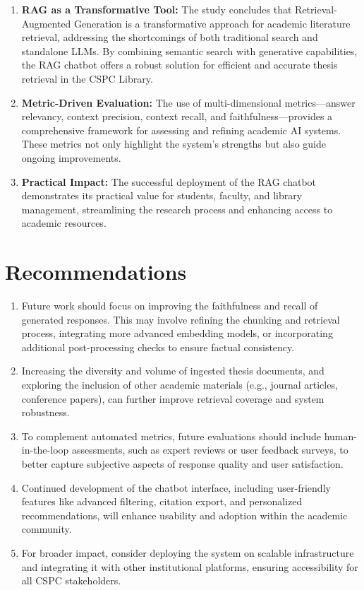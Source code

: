 \begin{refsection}
\begin{enumerate}
    \item \textbf{RAG as a Transformative Tool:} The study concludes that Retrieval-Augmented Generation is a transformative approach for academic literature retrieval, addressing the shortcomings of both traditional search and standalone LLMs. By combining semantic search with generative capabilities, the RAG chatbot offers a robust solution for efficient and accurate thesis retrieval in the CSPC Library.
    \item \textbf{Metric-Driven Evaluation:} The use of multi-dimensional metrics---answer relevancy, context precision, context recall, and faithfulness---provides a comprehensive framework for assessing and refining academic AI systems. These metrics not only highlight the system’s strengths but also guide ongoing improvements.
    \item \textbf{Practical Impact:} The successful deployment of the RAG chatbot demonstrates its practical value for students, faculty, and library management, streamlining the research process and enhancing access to academic resources.
\end{enumerate}

\section*{Recommendations}

\begin{enumerate}
    \item Future work should focus on improving the faithfulness and recall of generated responses. This may involve refining the chunking and retrieval process, integrating more advanced embedding models, or incorporating additional post-processing checks to ensure factual consistency.
    \item Increasing the diversity and volume of ingested thesis documents, and exploring the inclusion of other academic materials (e.g., journal articles, conference papers), can further improve retrieval coverage and system robustness.
    \item To complement automated metrics, future evaluations should include human-in-the-loop assessments, such as expert reviews or user feedback surveys, to better capture subjective aspects of response quality and user satisfaction.
    \item Continued development of the chatbot interface, including user-friendly features like advanced filtering, citation export, and personalized recommendations, will enhance usability and adoption within the academic community.
    \item For broader impact, consider deploying the system on scalable infrastructure and integrating it with other institutional platforms, ensuring accessibility for all CSPC stakeholders.
\end{enumerate}

\clearpage

\printbibliography[heading=subbibintoc, title={\centering Notes}]
\end{refsection}